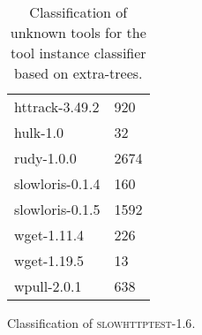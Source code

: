 \begin{table}[H]
\begin{subtable}{.45\linewidth}
\begin{tabular}{ll}
		httrack-3.49.2 & 920\\
		hulk-1.0 & 32\\
		rudy-1.0.0 & 2674\\
		slowloris-0.1.4 & 160\\
		slowloris-0.1.5 & 1592\\
		wget-1.11.4 & 226\\
		wget-1.19.5 & 13\\
		wpull-2.0.1 & 638\\
		\bottomrule
	\end{tabular}
	\caption{Classification of \textsc{slowhttptest-1.6}.}
	\end{subtable}
	\caption{Classification of unknown tools for the tool instance classifier based on extra-trees.}
	\label{tab:unknown_application_long_extra_trees}
\end{table}
